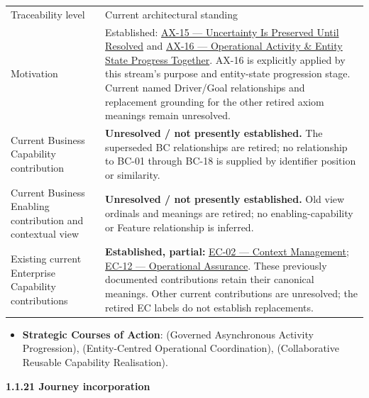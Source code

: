 \begin{longtable}{>{\raggedright\arraybackslash}p{}>{\raggedright\arraybackslash}p{}}
Traceability level & Current architectural standing \\
Motivation & Established: \hyperref[element:ef8abbaec37e4890ad78b9f263e67906]{AX-15 — Uncertainty Is Preserved Until Resolved} and \hyperref[element:de7e90f46127455a9ec9ad3b9b48ba54]{AX-16 — Operational Activity \& Entity State Progress Together}. AX-16 is explicitly applied by this stream’s purpose and entity-state progression stage. Current named Driver/Goal relationships and replacement grounding for the other retired axiom meanings remain unresolved. \\
Current Business Capability contribution & \textbf{Unresolved / not presently established.} The superseded BC relationships are retired; no relationship to BC-01 through BC-18 is supplied by identifier position or similarity. \\
Current Business Enabling contribution and contextual view & \textbf{Unresolved / not presently established.} Old view ordinals and meanings are retired; no enabling-capability or Feature relationship is inferred. \\
Existing current Enterprise Capability contributions & \textbf{Established, partial:} \href{\detokenize{../../../../../docs/markdown/02-strategy/capabilities/enterprise-capabilities.md#ec-02-context-management}}{EC-02 — Context Management}; \href{\detokenize{../../../../../docs/markdown/02-strategy/capabilities/enterprise-capabilities.md#ec-12-operational-assurance}}{EC-12 — Operational Assurance}. These previously documented contributions retain their canonical meanings. Other current contributions are unresolved; the retired EC labels do not establish replacements. \\
\end{longtable}


\begin{itemize}


\item \textbf{Strategic Courses of Action}: \texttt{} (Governed Asynchronous Activity Progression), \texttt{} (Entity-Centred Operational Coordination), \texttt{} (Collaborative Reusable Capability Realisation).

\end{itemize}


\par\medskip\textbf{1.1.21 Journey incorporation}\par


